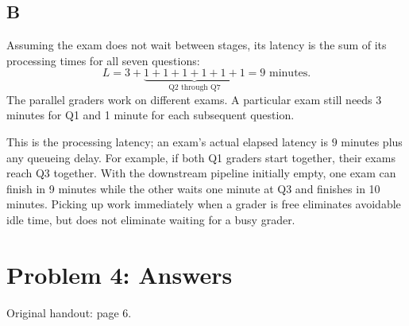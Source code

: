 \documentclass[letterpaper,12pt]{article}
\newcommand{\handout}[1]{%
  
}
\newenvironment{answer}{\par}{\par\medskip}
\begin{document}
\subsection*{B}
\begin{answer}
Assuming the exam does not wait between stages, its latency is the sum
of its processing times for all seven questions:
\[
  L = 3 + \underbrace{1+1+1+1+1+1}_{\text{Q2 through Q7}}
    = \boxed{9\text{ minutes}}.
\]
The parallel graders work on different exams. A particular exam still
needs 3 minutes for Q1 and 1 minute for each subsequent question.

This is the processing latency; an exam's actual elapsed latency is
$9$ minutes plus any queueing delay. For example, if both Q1 graders
start together, their exams reach Q3 together. With the downstream
pipeline initially empty, one exam can finish in 9 minutes while the
other waits one minute at Q3 and finishes in 10 minutes. Picking up work
immediately when a grader is free eliminates avoidable idle time, but
does not eliminate waiting for a busy grader.
\end{answer}

\clearpage

\handout{6}
\section*{Problem 4: Answers}
\noindent Original handout: page 6.\par
\end{document}
